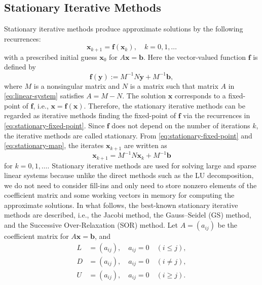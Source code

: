 \subsection{{Stationary Iterative Methods}}\label{sec:stationary-iterations}
{Stationary iterative methods produce approximate solutions by the following recurrences:}
\begin{equation}\label{eq:stationary-fixed-point}
\bm x_{k+1}=\bm f(\bm x_k),\quad k=0,1,\ldots
\end{equation}
{with a prescribed initial guess $\bm x_0$ for $A\bm x=\bm b$. Here the vector-valued function $\bm f$ is defined by}
\begin{equation}\label{eq:stationary-map}
\bm f(\bm y):=M^{-1}N\bm y+M^{-1}\bm b,
\end{equation}
{where $M$ is a nonsingular matrix and $N$ is a matrix such that matrix $A$ in \eqref{eq:linear-system} satisfies $A=M-N$. The solution $\bm x$ corresponds to a fixed-point of $\bm f$, i.e., $\bm x=\bm f(\bm x)$. Therefore, the stationary iterative methods can be regarded as iterative methods finding the fixed-point of $\bm f$ via the recurrences in \eqref{eq:stationary-fixed-point}. Since $\bm f$ does not depend on the number of iterations $k$, the iterative methods are called stationary. From \eqref{eq:stationary-fixed-point} and \eqref{eq:stationary-map}, the iterates $\bm x_{k+1}$ are written as}
\begin{equation}\label{eq:stationary-splitting-iteration}
\bm x_{k+1}=M^{-1}N\bm x_k+M^{-1}\bm b
\end{equation}
{for $k=0,1,\ldots$.}
{Stationary iterative methods are used for solving large and sparse linear systems because unlike the direct methods such as the LU decomposition, we do not need to consider fill-ins and only need to store nonzero elements of the coefficient matrix and some working vectors in memory for computing the approximate solutions.}
{In what follows, the best-known stationary iterative methods are described, i.e., the Jacobi method, the Gauss--Seidel (GS) method, and the Successive Over-Relaxation (SOR) method. Let $A=(a_{ij})$ be the coefficient matrix for $A\bm x=\bm b$, and}
\[
\begin{aligned}
L&=(a_{ij}),\quad a_{ij}=0\quad(i\le j),\\
D&=(a_{ij}),\quad a_{ij}=0\quad(i\ne j),\\
U&=(a_{ij}),\quad a_{ij}=0\quad(i\ge j).
\end{aligned}
\]
